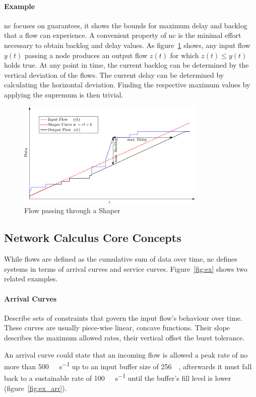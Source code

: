 \paragraph{Example}
\gls{nc} focuses on guarantees, it shows the bounds for maximum delay and backlog that a flow can experience.
A convenient property of \gls{nc} is the minimal effort necessary to obtain backlog and delay values.
As figure~\ref{fig:nc_basics1} shows, any input flow $y(t)$ passing a node produces an output flow $z(t)$ for which  $z(t) \le y(t)$ holds true.
At any point in time, the current backlog can be determined by the vertical deviation of the flows.
The current delay can be determined by calculating the horizontal deviation.
Finding the respective maximum values by applying the supremum is then trivial.
%
\begin{figure}[H]
  \centering
  \includegraphics*[width=0.8\textwidth,height=\textheight,keepaspectratio]{Figures/nc_basics1}
  \caption{Flow passing through a Shaper}
  \label{fig:nc_basics1}
\end{figure}
%
\subsection{Network Calculus Core Concepts}
%
While flows are defined as the cumulative sum of data over time, \gls{nc} defines systems in terms of arrival curves and service curves. Figure~\ref{fig:ex} shows two related examples.
\paragraph{Arrival Curves} Describe sets of constraints that govern the input flow's behaviour over time.
These curves are usually piece-wise linear, concave functions. Their slope describes the maximum allowed rates, their vertical offset the burst tolerance.
\par
An arrival curve could state that an incoming flow is allowed a peak rate of no more than \SI{500}{\mega\bit\per\second} up to an input buffer size of \SI{256}{\mega\byte},
afterwards it must fall back to a sustainable rate of \SI{100}{\mega\bit\per\second} until the buffer's fill level is lower (figure~\ref{fig:ex_arr}).
